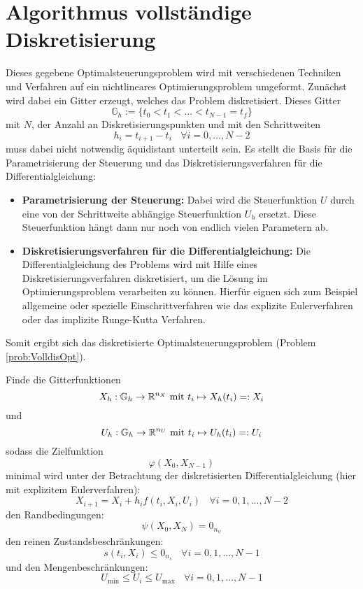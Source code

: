 \section{Algorithmus vollständige Diskretisierung}
Dieses gegebene Optimalsteuerungsproblem wird mit verschiedenen Techniken und Verfahren auf ein nichtlineares Optimierungsproblem umgeformt. Zunächst wird dabei ein Gitter erzeugt, welches das Problem diskretisiert. Dieses Gitter 
\begin{equation}
\mathbb{G}_h := \lbrace t_0 < t_1 < ... < t_{N-1} = t_f \rbrace
\end{equation}
mit $N$, der Anzahl an Diskretisierungspunkten und mit den Schrittweiten 
\begin{equation}
h_i = t_{i+1} - t_i \ \ \ \ \forall i = 0,...,N-2
\end{equation}
muss dabei nicht notwendig äquidistant unterteilt sein. Es stellt die Basis für die Parametrisierung der Steuerung und das Diskretisierungsverfahren für die Differentialgleichung:
\begin{itemize}
\item \textbf{Parametrisierung der Steuerung:} Dabei wird die Steuerfunktion $U$ durch eine von der Schrittweite abhängige Steuerfunktion $U_h$ ersetzt. Diese Steuerfunktion hängt dann nur noch von endlich vielen Parametern ab.
%
\item \textbf{Diskretisierungsverfahren für die Differentialgleichung:} Die Differentialgleichung des Problems wird mit Hilfe eines Diskretisierungsverfahren diskretisiert, um die Lösung im Optimierungsproblem verarbeiten zu können. Hierfür eignen sich zum Beispiel allgemeine oder spezielle Einschrittverfahren wie das explizite Eulerverfahren oder das implizite Runge-Kutta Verfahren.
\end{itemize}
Somit ergibt sich das diskretisierte Optimalsteuerungsproblem (Problem \ref{prob:VolldisOpt}).

\begin{problem}\label{prob:VolldisOpt}
Finde die Gitterfunktionen \[X_h : \mathbb{G}_h \to \mathbb{R}^{n_X} \text{ mit } t_i \mapsto X_h(t_i) =: X_i\] und \[U_h : \mathbb{G}_h \to \mathbb{R}^{n_U} \text{ mit } t_i \mapsto U_h(t_i) =: U_i\] sodass die Zielfunktion \[\varphi(X_0,X_{N-1})\] minimal wird unter der Betrachtung der diskretisierten  Differentialgleichung (hier mit explizitem Eulerverfahren): \[X_{i+1} = X_{i} + h_i f(t_i,X_i,U_i) \ \ \ \ \forall i = 0,1,...,N-2\] den Randbedingungen: \[\psi(X_0,X_N) = 0_{n_{\psi}}\] den reinen Zustandsbeschränkungen: \[s(t_i,X_i) \leq 0_{n_s} \ \ \ \ \forall i = 0,1,...,N-1\] und den Mengenbeschränkungen: \[U_{\min} \leq U_i \leq U_{\max} \ \ \ \ \forall i = 0,1,...,N-1\]
\end{problem}

